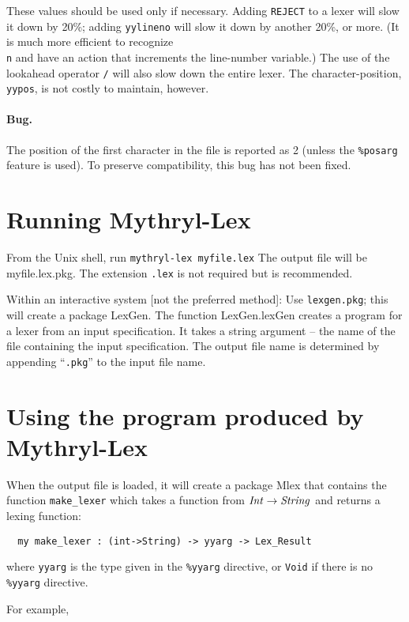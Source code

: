 These values should be used only if necessary.  Adding {\tt REJECT} to a
lexer will slow it down by 20\%; adding {\tt yylineno} will slow it down by
another 20\%, or more.  (It is much more efficient to 
recognize {\tt \\n} and
have an action that increments the line-number variable.)  The use of
the lookahead operator {\tt /} will also slow down the entire lexer.
The character-position, {\tt yypos}, is not costly to maintain, however.

\paragraph{Bug.} The position of the first character in the file
is reported as 2 (unless the {\tt \%posarg} feature is used).
To preserve compatibility, this bug has not been fixed.

\section{Running Mythryl-Lex}

From the Unix shell, run    {\tt mythryl-lex~myfile.lex}
The output file will be myfile.lex.pkg.  The extension {\tt .lex} is not
required but is recommended.

Within an interactive system [not the preferred method]:
Use {\tt lexgen.pkg}; this will create a package LexGen.  The function
LexGen.lexGen creates a program for a lexer from an input
specification.  It takes a string argument -- the name of the file
containing the input specification.  The output file name is
determined by appending ``{\tt .pkg}'' to the input file name.

\section{Using the program produced by Mythryl-Lex}

When the output file is loaded, it will create a package Mlex that
contains the function {\tt make_lexer} which takes a function from
${\it Int} \rightarrow {\it String}$ and returns a lexing function:

\begin{verbatim}
  my make_lexer : (int->String) -> yyarg -> Lex_Result
\end{verbatim}
where {\tt yyarg} is the type given in the {\tt \%yyarg} directive,
or {\tt Void} if there is no {\tt \%yyarg} directive.

For example,

